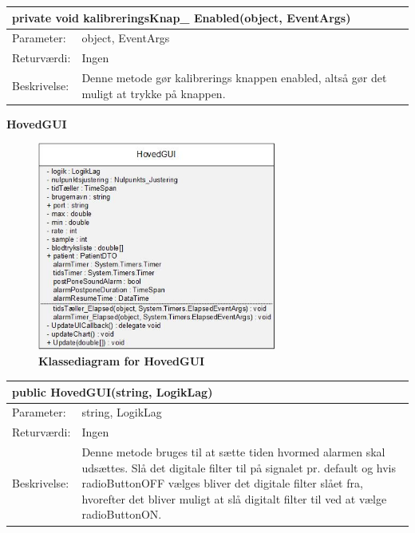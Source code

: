 \begin{table}[H]
\label{tab:tabel2}
\begin{tabular}{| l | p{13cm} |}
   \hline
   \multicolumn{2}{|l|}{private void kalibreringsKnap\_ Enabled(object, EventArgs)} \\ \hline
   Parameter: & object, EventArgs\\ \hline
   Returværdi: & Ingen \\ \hline
   Beskrivelse: & Denne metode gør kalibrerings knappen enabled, altså gør det muligt at trykke på knappen.\\ \hline
\end{tabular}
\end{table}
\textbf{HovedGUI}
\begin{figure}[H]
\includegraphics[width =0.7\textwidth , center]{billeder/klassediagramHoved}
\caption{\textbf{Klassediagram for HovedGUI}}
\end{figure}
\begin{table}[H]
\label{tab:tabel2}
\begin{tabular}{| l | p{13cm} |}
   \hline
   \multicolumn{2}{|l|}{public HovedGUI(string, LogikLag)} \\ \hline
   Parameter: & string, LogikLag\\ \hline
   Returværdi: & Ingen \\ \hline
   Beskrivelse: & Denne metode bruges til at sætte tiden hvormed alarmen skal udsættes. Slå det digitale filter til på signalet pr. default og hvis radioButtonOFF vælges bliver det digitale filter slået fra, hvorefter det bliver muligt at slå digitalt filter til ved at vælge radioButtonON.\\ \hline
\end{tabular}
\end{table}

